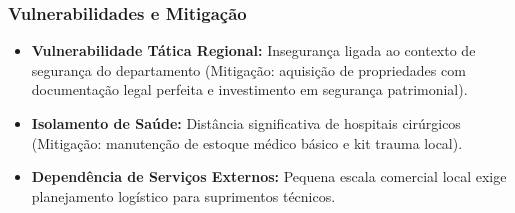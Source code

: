 \subsubsection{Vulnerabilidades e
Mitigação}

\begin{itemize}
\tightlist
\item
  \textbf{Vulnerabilidade Tática Regional:} Insegurança ligada ao
  contexto de segurança do departamento (Mitigação: aquisição de
  propriedades com documentação legal perfeita e investimento em
  segurança patrimonial).
\item
  \textbf{Isolamento de Saúde:} Distância significativa de hospitais
  cirúrgicos (Mitigação: manutenção de estoque médico básico e kit
  trauma local).
\item
  \textbf{Dependência de Serviços Externos:} Pequena escala comercial
  local exige planejamento logístico para suprimentos técnicos.
\end{itemize}

